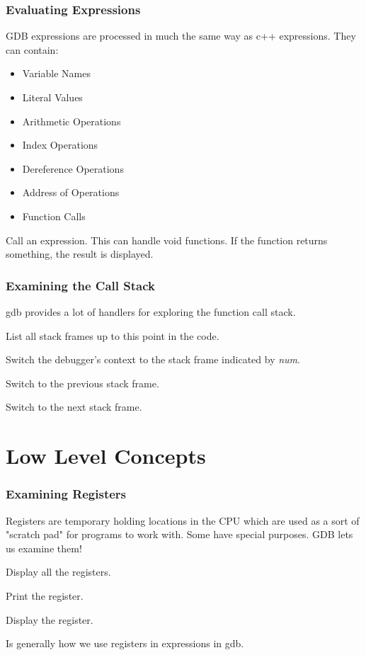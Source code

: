\documentclass{beamer}
\begin{document}
\begin{frame}
    \frametitle{Evaluating Expressions}
    GDB expressions are processed in much the same way as 
    c++ expressions.  They can contain:
    \begin{itemize}[<+->]
        \item Variable Names
        \item Literal Values
        \item Arithmetic Operations
        \item Index Operations
        \item Dereference Operations
        \item Address of Operations
        \item Function Calls
    \end{itemize}
    
    \begin{description}[<+->]
        \item[call {\it exp}] Call an expression.  This can handle void functions.  If the function returns something, the result is displayed.
    \end{description}
\end{frame}

\begin{frame}
    \frametitle{Examining the Call Stack}
    gdb provides a lot of handlers for exploring the 
    function call stack.
    \begin{description}[<+->]
        \item[backtrace] List all stack frames up to this point in the code.
        \item[frame {\it num}] Switch the debugger's context to the stack frame indicated by {\it num}. 
        \item[up] Switch to the previous stack frame.
        \item[down] Switch to the next stack frame.
    \end{description}
\end{frame}

\section{Low Level Concepts}

\begin{frame}
    \frametitle{Examining Registers}
    Registers are temporary holding locations in the CPU
    which are used as a sort of "scratch pad" for programs to work with.  Some have special purposes.  GDB lets us examine them!
    \begin{description}[<+->]
        \item[info registers] Display all the registers.
        \item[print \${\it register}] Print the register.
        \item[display \${\it register}] Display the register.
        \item[\${\it register}] Is generally how we use registers in expressions in gdb.
    \end{description}
\end{frame}
\end{document}
